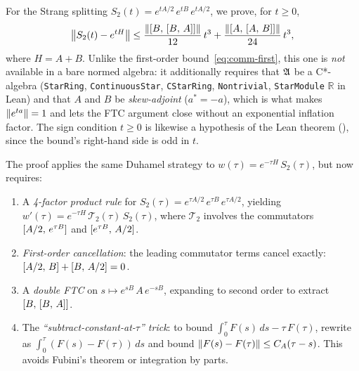 For the Strang splitting $S_2(t) = e^{tA/2}\,e^{tB}\,e^{tA/2}$, we prove, for
$t \ge 0$,
\begin{equation}\label{eq:strang-bound}
  \left\|S_2(t) - e^{tH}\right\|
    \le \frac{\left\|[B,\,[B,\,A]]\right\|}{12}\,t^3
      + \frac{\left\|[A,\,[A,\,B]]\right\|}{24}\,t^3,
\end{equation}
where $H = A + B$. Unlike the first-order bound~\eqref{eq:comm-first}, this
one is \emph{not} available in a bare normed algebra: it additionally requires
that $\mathfrak{A}$ be a C*-algebra (\texttt{StarRing}, \texttt{ContinuousStar},
\texttt{CStarRing}, \texttt{Nontrivial}, \texttt{StarModule} $\mathbb{R}$ in
Lean) and that $A$ and $B$ be \emph{skew-adjoint} ($a^* = -a$), which is what
makes $\left\|e^{ta}\right\| = 1$ and lets the FTC argument close without an
exponential inflation factor. The sign condition $t \ge 0$ is likewise a
hypothesis of the Lean theorem
(),
since the bound's right-hand side is odd in $t$.

The proof applies the same Duhamel strategy to
$w(\tau) = e^{-\tau H}\,S_2(\tau)$, but now requires:
\begin{enumerate}
  \item A \emph{4-factor product rule} for $S_2(\tau) = e^{\tau A/2}\,e^{\tau B}\,e^{\tau A/2}$,
    yielding $w'(\tau) = e^{-\tau H}\,\mathcal{T}_2(\tau)\,S_2(\tau)$, where $\mathcal{T}_2$
    involves the commutators $[A/2,\,e^{\tau B}]$ and $[e^{\tau B},\,A/2]$.

  \item \emph{First-order cancellation}: the leading commutator terms cancel
    exactly: $[A/2,\,B] + [B,\,A/2] = 0$.

  \item A \emph{double FTC} on $s \mapsto e^{sB}\,A\,e^{-sB}$, expanding to
    second order to extract $[B,\,[B,\,A]]$.

  \item The \emph{``subtract-constant-at-$\tau$'' trick}: to bound
    $\int_0^\tau F(s)\,ds - \tau\,F(\tau)$, rewrite as
    $\int_0^\tau (F(s) - F(\tau))\,ds$ and bound $\left\|F(s) - F(\tau)\right\|
    \le C_A(\tau - s)$.
    This avoids Fubini's theorem or integration by parts.
\end{enumerate}

